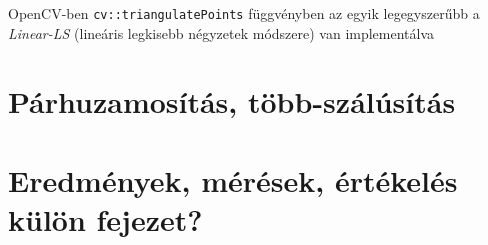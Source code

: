 OpenCV-ben \texttt{cv::triangulatePoints} függvényben az egyik legegyszerűbb a \textit{Linear-LS} (lineáris legkisebb négyzetek módszere) van implementálva


\section{Párhuzamosítás, több-szálúsítás}


\section{Eredmények, mérések, értékelés {\color{red} külön fejezet?}}

